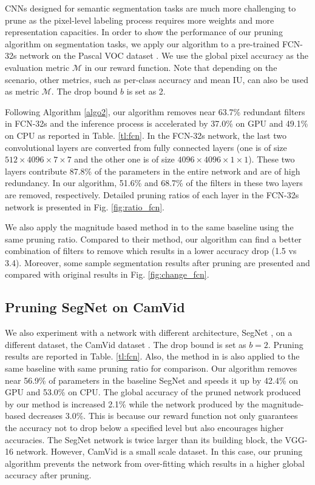 \documentclass[10pt,twocolumn,letterpaper]{article}
\begin{document}
CNNs designed for semantic segmentation tasks are much more challenging to prune as the pixel-level labeling process requires more weights and more representation capacities. In order to show the performance of our pruning algorithm on segmentation tasks, we apply our algorithm to a pre-trained FCN-32s network \cite{fcn} on the Pascal VOC dataset \cite{pascal}. We use the global pixel accuracy as the evaluation metric $\mathcal{M}$ in our reward function. Note that depending on the scenario, other metrics, such as per-class accuracy and mean IU, can also be used as metric $\mathcal{M}$. The drop bound $b$ is set as 2. 

Following Algorithm \ref{algo2}, our algorithm removes near 63.7\% redundant filters in FCN-32s and the inference process is accelerated by 37.0\% on GPU and 49.1\% on CPU as reported in Table. \ref{tl:fcn}. In the FCN-32s network, the last two convolutional layers are converted from fully connected layers (one is of size $512 \times 4096 \times 7 \times 7$ and the other one is of size $4096 \times 4096 \times 1 \times 1$). These two layers contribute 87.8\% of the parameters in the entire network and are of high redundancy. In our algorithm, 51.6\% and 68.7\% of the filters in these two layers are removed, respectively. Detailed pruning ratios of each layer in the FCN-32s network is presented in Fig. \ref{fig:ratio_fcn}. 

We also apply the magnitude based method in \cite{iclr17} to the same baseline using the same pruning ratio. Compared to their method, our algorithm can find a better combination of filters to remove which results in a lower accuracy drop (1.5 vs 3.4). Moreover, some sample segmentation results after pruning are presented and compared with original results in Fig. \ref{fig:change_fcn}.






\subsection{Pruning SegNet on CamVid}
We also experiment with a network with different architecture, SegNet \cite{segnet}, on a different dataset, the CamVid dataset \cite{camvid}. The drop bound is set as $b=2$. Pruning results are reported in Table. \ref{tl:fcn}. Also, the method in \cite{iclr17} is also applied to the same baseline with same pruning ratio for comparison. Our algorithm removes near 56.9\% of parameters in the baseline SegNet and speeds it up by 42.4\% on GPU and 53.0\% on CPU. The global accuracy of the pruned network produced by our method is increased 2.1\% while the network produced by the magnitude-based decreases 3.0\%. This is because our reward function not only guarantees the accuracy not to drop below a specified level but also encourages higher accuracies. The SegNet network is twice larger than its building block, the VGG-16 network. However, CamVid is a small scale dataset. In this case, our pruning algorithm prevents the network from over-fitting which results in a higher global accuracy after pruning.
\end{document}

